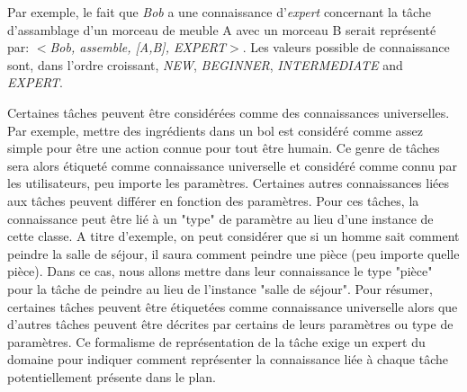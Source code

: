 \documentclass[a4paper,11pt,twoside]{StyleThese}
\begin{document}

%
Par exemple, le fait que \textit{Bob} a une connaissance d'\textit{expert} concernant la tâche d'assamblage d'un morceau de meuble A avec un morceau B serait représenté par:
\textit{$<$Bob, assemble, [A,B], EXPERT$>$}.
Les valeurs possible de connaissance sont, dans l'ordre croissant, \textit{NEW}, \textit{BEGINNER}, \textit{INTERMEDIATE} and \textit{EXPERT}. 

Certaines tâches peuvent être considérées comme des connaissances universelles. Par exemple, mettre des ingrédients dans un bol est considéré comme assez simple pour être une action connue pour tout être humain. Ce genre de tâches sera alors étiqueté comme connaissance universelle et considéré comme connu par les utilisateurs, peu importe les paramètres. Certaines autres connaissances liées aux tâches peuvent différer en fonction des paramètres. Pour ces tâches, la connaissance peut être lié à un "type" de paramètre au lieu d'une instance de cette classe.
A titre d'exemple, on peut considérer que si un homme sait comment peindre la salle de séjour, il saura comment peindre une pièce (peu importe quelle pièce). Dans ce cas, nous allons mettre dans leur connaissance le type "pièce" pour la tâche de peindre au lieu de l'instance "salle de séjour".
Pour résumer, certaines tâches peuvent être étiquetées comme connaissance universelle alors que d'autres tâches peuvent être décrites par certains de leurs paramètres ou type de paramètres.
Ce formalisme de représentation de la tâche exige un expert du domaine pour indiquer comment représenter la connaissance liée à chaque tâche potentiellement présente dans le plan.

\end{document}
